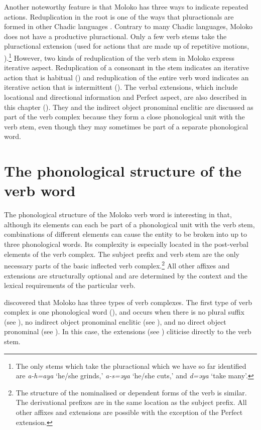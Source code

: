 Another noteworthy feature is that Moloko has three ways to indicate repeated actions. Reduplication in the root is one of the ways that pluractionals are formed in other Chadic languages \citep{Newman1990}. Contrary to many Chadic languages, Moloko does not have a productive pluractional. Only a few verb stems take the pluractional extension (used for actions that are made up of repetitive motions, ).\footnote{The only stems which take the pluractional which we have so far identified are \textit{a-h=aya} ‘he/she grinds,’ \textit{a-s=əya} ‘he/she cuts,’ and \textit{d=əya} ‘take many’.} However, two kinds of reduplication of the verb stem in Moloko express iterative aspect. Reduplication of a consonant in the stem indicates an iterative action that is habitual () and reduplication of the entire verb word indicates an iterative action that is intermittent ().  
\largerpage
The verbal extensions, which include locational and directional information and Perfect aspect, are also described in this chapter (). They and the indirect object pronominal enclitic are discussed as part of the verb complex because they form a close phonological unit with the verb stem, even though they may sometimes be part of a separate phonological word.  

\section{The phonological structure of the verb word}\label{sec:7.1}%
\hypertarget{RefHeading1212101525720847}{}
The phonological structure of the Moloko verb word is interesting in that, although its elements can each be part of a phonological unit with the verb stem, combinations of different elements can cause the entity to be broken into up to three phonological words. Its complexity is especially located in the post-verbal elements of the verb complex. The subject prefix and verb stem are the only necessary parts of the basic inflected verb complex.\footnote{The structure of the nominalised or dependent forms of the verb is similar. The derivational prefixes are in the same location as the subject prefix. All other affixes and extensions are possible with the exception of the Perfect extension. } All other affixes and extensions are structurally optional and are determined by the context and the lexical requirements of the particular verb. 

\citet{FriesenMamalis2008} discovered that Moloko has three types of verb complexes. The first type of verb complex is one phonological word (), and occurs when there is no plural suffix (see ), no indirect object pronominal enclitic (see ), and no direct object pronominal (see ). In this case, the extensions (see ) cliticise directly to the verb stem. 


